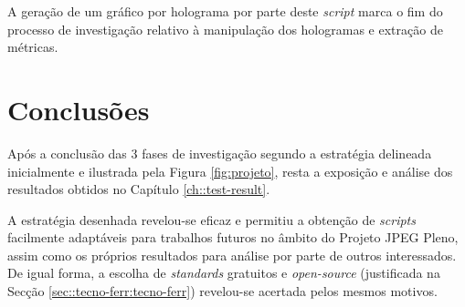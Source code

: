 A geração de um gráfico por holograma por parte deste \textit{script} marca o fim do processo de investigação relativo à manipulação dos hologramas e extração de métricas.


\section{Conclusões}
\label{sec::imp-test:conclusao}

Após a conclusão das 3 fases de investigação segundo a estratégia delineada inicialmente e ilustrada pela Figura \ref{fig:projeto}, resta a exposição e análise dos resultados obtidos no Capítulo \ref{ch::test-result}.

A estratégia desenhada revelou-se eficaz e permitiu a obtenção de \textit{scripts} facilmente adaptáveis para trabalhos futuros no âmbito do Projeto JPEG Pleno, assim como os próprios resultados para análise por parte de outros interessados. De igual forma, a escolha de \textit{standards} gratuitos e \textit{open-source} (justificada na Secção \ref{sec::tecno-ferr:tecno-ferr}) revelou-se acertada pelos mesmos motivos.

